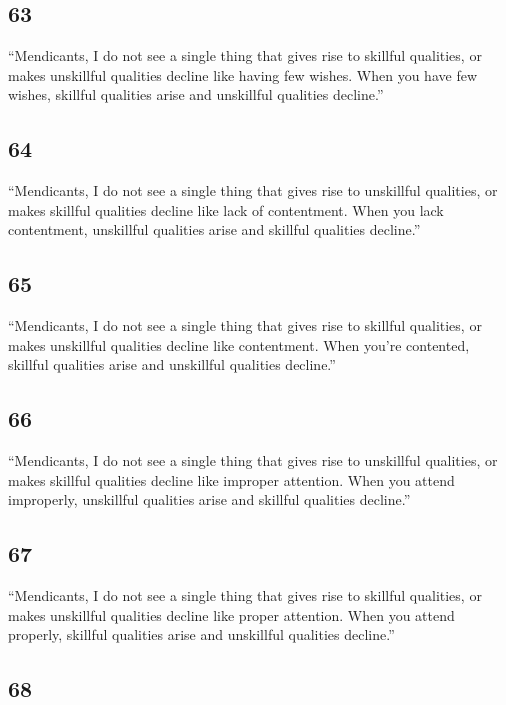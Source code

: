 \documentclass[12pt,openany]{book}%
\begin{document}
\subsection*{63 }

“Mendicants, I do not see a single thing that gives rise to skillful qualities, or makes unskillful qualities decline like having few wishes. When you have few wishes, skillful qualities arise and unskillful qualities decline.” 

\subsection*{64 }

“Mendicants, I do not see a single thing that gives rise to unskillful qualities, or makes skillful qualities decline like lack of contentment. When you lack contentment, unskillful qualities arise and skillful qualities decline.” 

\subsection*{65 }

“Mendicants, I do not see a single thing that gives rise to skillful qualities, or makes unskillful qualities decline like contentment. When you’re contented, skillful qualities arise and unskillful qualities decline.” 

\subsection*{66 }

“Mendicants, I do not see a single thing that gives rise to unskillful qualities, or makes skillful qualities decline like improper attention. When you attend improperly, unskillful qualities arise and skillful qualities decline.” 

\subsection*{67 }

“Mendicants, I do not see a single thing that gives rise to skillful qualities, or makes unskillful qualities decline like proper attention. When you attend properly, skillful qualities arise and unskillful qualities decline.” 

\subsection*{68 }
\end{document}
